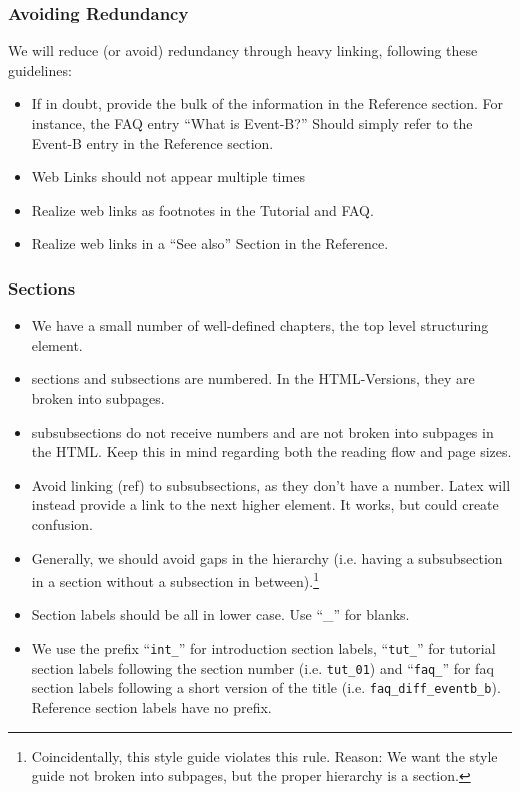 \subsubsection{Avoiding Redundancy}

We will reduce (or avoid) redundancy through heavy linking, following these guidelines:

\begin{itemize}
	\item If in doubt, provide the bulk of the information in the Reference section.  For instance, the FAQ entry ``What is Event-B?''  Should simply refer to the Event-B entry in the Reference section.
	\item Web Links should not appear multiple times
	\item Realize web links as footnotes in the Tutorial and FAQ.
	\item Realize web links in a ``See also'' Section in the Reference.
\end{itemize}

\subsubsection{Sections}

\begin{itemize}
	\item We have a small number of well-defined chapters, the top level structuring element.
	\item sections and subsections are numbered.  In the HTML-Versions, they are broken into subpages.
    \item subsubsections do not receive numbers and are not broken into subpages in the HTML.  Keep this in mind regarding both the reading flow and page sizes.
	\item Avoid linking (ref) to subsubsections, as they don't have a number.  Latex will instead provide a link to the next higher element.  It works, but could create confusion.
	\item Generally, we should avoid gaps in the hierarchy (i.e. having a subsubsection in a section without a subsection in between).\footnote{Coincidentally, this style guide violates this rule. Reason: We want the style guide not broken into subpages, but the proper hierarchy is a section.}
	\item Section labels should be all in lower case. Use ``\_'' for blanks.
	\item We use the prefix ``\texttt{int\_}'' for introduction section labels, ``\texttt{tut\_}'' for tutorial section labels following the section number (i.e. \texttt{tut\_01}) and ``\texttt{faq\_}'' for faq section labels following a short version of the title (i.e. \texttt{faq\_diff\_eventb\_b}). Reference section labels have no prefix.
\end{itemize}


